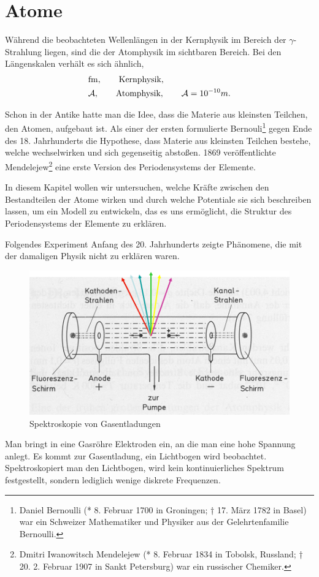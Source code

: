 \section{Atome}

Während die beobachteten Wellenlängen in der Kernphysik im Bereich der
$\gamma$-Strahlung liegen, sind die der Atomphysik im sichtbaren Bereich. Bei
den Längenskalen verhält es sich ähnlich,
\begin{align*}
&\mathrm{fm},\qquad\text{Kernphysik},\\
&\mathrm{\AA},\qquad\text{Atomphysik},\qquad \AA = 10^{-10}m.
\end{align*}

Schon in der Antike hatte man die Idee, dass die Materie aus kleinsten
Teilchen, den Atomen, aufgebaut ist. Als einer der ersten formulierte
Bernouli\footnote{Daniel Bernoulli (* 8. Februar 1700 in Groningen; † 17. März
1782 in Basel)  war ein Schweizer Mathematiker und Physiker aus der
Gelehrtenfamilie Bernoulli.} gegen Ende des 18. Jahrhunderts die Hypothese, dass Materie  aus kleinsten Teilchen bestehe, welche wechselwirken und sich
gegenseitig abstoßen. 1869 veröffentlichte Mendelejew\footnote{Dmitri
Iwanowitsch Mendelejew (* 8. Februar 1834 in Tobolsk, Russland; † 20.
2. Februar 1907 in Sankt Petersburg) war ein russischer Chemiker.} eine erste
Version des Periodensystems der Elemente.

In diesem Kapitel wollen wir untersuchen, welche Kräfte zwischen den
Bestandteilen der Atome wirken und durch welche Potentiale sie sich beschreiben
lassen, um ein Modell zu entwickeln, das es uns ermöglicht, die Struktur des
Periodensystems der Elemente zu erklären.
\begin{bspn}
Folgendes Experiment Anfang des 20. Jahrhunderts zeigte Phänomene, die mit der
damaligen Physik nicht zu erklären waren.

\begin{figure}[!htbp]
	\centering
	\includegraphics[width=\textwidth]{fig/3-SpektroskopieGasentladung.png}
	\caption{Spektroskopie von Gasentladungen}
\end{figure}

Man bringt in eine Gasröhre Elektroden ein, an die man eine hohe Spannung
anlegt. Es kommt zur Gasentladung, ein Lichtbogen wird beobachtet.
Spektroskopiert man den Lichtbogen, wird kein kontinuierliches Spektrum
festgestellt, sondern lediglich wenige diskrete Frequenzen.\bsphere
\end{bspn}

